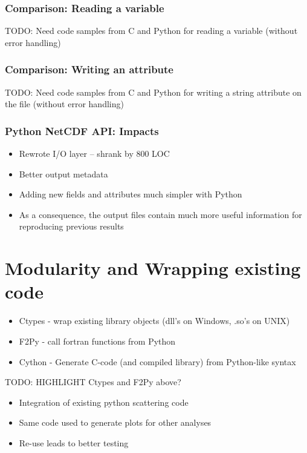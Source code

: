 \documentclass[red, hyperref={pdfpagelabels=false}]{beamer}
\begin{document}
\begin{frame}
  \frametitle{Comparison: Reading a variable}
  TODO: Need code samples from C and Python for reading a variable (without error handling)
\end{frame}

\begin{frame}
  \frametitle{Comparison: Writing an attribute}
  TODO: Need code samples from C and Python for writing a string attribute on the file (without error handling)
\end{frame}

\begin{frame}
  \frametitle{Python NetCDF API: Impacts}
  \begin{itemize}
    \item Rewrote I/O layer -- shrank by 800 LOC
    \item Better output metadata
    \item Adding new fields and attributes much simpler with Python
    \item As a consequence, the output files contain much more useful
      information for reproducing previous results
  \end{itemize}
\end{frame}

\section[Modularity]{Modularity and Wrapping existing code}
\begin{frame}
  \begin{itemize}
    \item Ctypes - wrap existing library objects (dll's on Windows, .so's on UNIX)
    \item F2Py - call fortran functions from Python
    \item Cython - Generate C-code (and compiled library) from Python-like syntax
  \end{itemize}
  TODO: HIGHLIGHT Ctypes and F2Py above?
\end{frame}

\begin{frame}
  \begin{itemize}
    \item Integration of existing python scattering code
    \item Same code used to generate plots for other analyses
    \item Re-use leads to better testing
  \end{itemize}
\end{frame}
\end{document}
